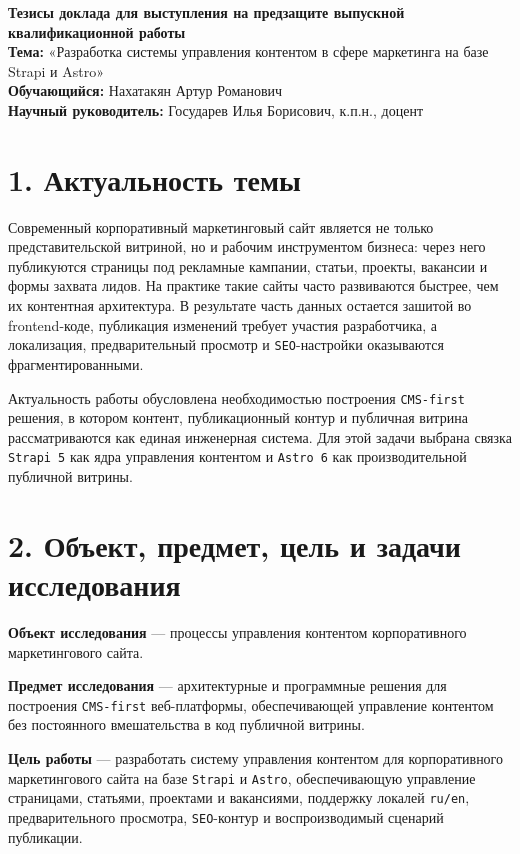 \documentclass[12pt,a4paper]{article}
\begin{document}
\begin{center}
{\Large \textbf{Тезисы доклада для выступления на предзащите выпускной квалификационной работы}}\\[0.8em]
{\normalsize \textbf{Тема:} «Разработка системы управления контентом в сфере маркетинга на базе Strapi и Astro»}\\[0.4em]
{\normalsize \textbf{Обучающийся:} Нахатакян Артур Романович}\\
{\normalsize \textbf{Научный руководитель:} Государев Илья Борисович, к.п.н., доцент}
\end{center}

\section*{1. Актуальность темы}

Современный корпоративный маркетинговый сайт является не только представительской витриной,
но и рабочим инструментом бизнеса: через него публикуются страницы под рекламные кампании,
статьи, проекты, вакансии и формы захвата лидов. На практике такие сайты часто развиваются
быстрее, чем их контентная архитектура. В результате часть данных остается зашитой во
frontend-коде, публикация изменений требует участия разработчика, а локализация,
предварительный просмотр и \texttt{SEO}-настройки оказываются фрагментированными.

Актуальность работы обусловлена необходимостью построения \texttt{CMS-first} решения, в
котором контент, публикационный контур и публичная витрина рассматриваются как единая
инженерная система. Для этой задачи выбрана связка \texttt{Strapi 5} как ядра управления
контентом и \texttt{Astro 6} как производительной публичной витрины.

\section*{2. Объект, предмет, цель и задачи исследования}

\textbf{Объект исследования} --- процессы управления контентом корпоративного маркетингового
сайта.

\textbf{Предмет исследования} --- архитектурные и программные решения для построения
\texttt{CMS-first} веб-платформы, обеспечивающей управление контентом без постоянного
вмешательства в код публичной витрины.

\textbf{Цель работы} --- разработать систему управления контентом для корпоративного
маркетингового сайта на базе \texttt{Strapi} и \texttt{Astro}, обеспечивающую управление
страницами, статьями, проектами и вакансиями, поддержку локалей \texttt{ru/en},
предварительного просмотра, \texttt{SEO}-контур и воспроизводимый сценарий публикации.
\end{document}
